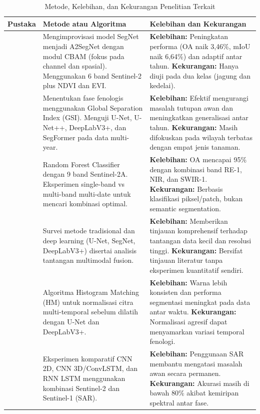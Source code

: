 \begin{table}[H]
    \centering
    \caption{Metode, Kelebihan, dan Kekurangan Penelitian Terkait}
    \label{tab:penelitian_detail}
    \footnotesize
    \begin{tabularx}{\textwidth}{|l|X|X|}
    \hline
    \textbf{Pustaka} & \textbf{Metode atau Algoritma} & \textbf{Kelebihan dan Kekurangan} \\ \hline
    \cite{gao2023} & Mengimprovisasi model SegNet menjadi A2SegNet dengan modul CBAM (fokus pada channel dan spasial). Menggunakan 6 band Sentinel-2 plus NDVI dan EVI. & \textbf{Kelebihan:} Peningkatan performa (OA naik 3,46\%, mIoU naik 6,64\%) dan adaptif antar tahun. \textbf{Kekurangan:} Hanya diuji pada dua kelas (jagung dan kedelai). \\ \hline
    \cite{li2023hetao} & Menentukan fase fenologis menggunakan Global Separation Index (GSI). Menguji U-Net, U-Net++, DeepLabV3+, dan SegFormer pada data multi-year. & \textbf{Kelebihan:} Efektif mengurangi masalah tutupan awan dan meningkatkan generalisasi antar tahun. \textbf{Kekurangan:} Masih difokuskan pada wilayah terbatas dengan empat jenis tanaman. \\ \hline
    \cite{yi2020} & Random Forest Classifier dengan 9 band Sentinel-2A. Eksperimen single-band vs multi-band multi-date untuk mencari kombinasi optimal. & \textbf{Kelebihan:} OA mencapai 95\% dengan kombinasi band RE-1, NIR, dan SWIR-1. \textbf{Kekurangan:} Berbasis klasifikasi piksel/patch, bukan semantic segmentation. \\ \hline
    \cite{luo2024} & Survei metode tradisional dan deep learning (U-Net, SegNet, DeepLabV3+) disertai analisis tantangan multimodal fusion. & \textbf{Kelebihan:} Memberikan tinjauan komprehensif terhadap tantangan data kecil dan resolusi tinggi. \textbf{Kekurangan:} Bersifat tinjauan literatur tanpa eksperimen kuantitatif sendiri. \\ \hline
    \cite{wang2023} & Algoritma Histogram Matching (HM) untuk normalisasi citra multi-temporal sebelum dilatih dengan U-Net dan DeepLabV3+. & \textbf{Kelebihan:} Warna lebih konsisten dan performa segmentasi meningkat pada data antar waktu. \textbf{Kekurangan:} Normalisasi agresif dapat menyamarkan variasi temporal fenologi. \\ \hline
    \cite{cheng2023} & Eksperimen komparatif CNN 2D, CNN 3D/ConvLSTM, dan RNN LSTM menggunakan kombinasi Sentinel-2 dan Sentinel-1 (SAR). & \textbf{Kelebihan:} Penggunaan SAR membantu mengatasi masalah awan secara permanen. \textbf{Kekurangan:} Akurasi masih di bawah 80\% akibat kemiripan spektral antar fase. \\ \hline

\end{tabularx}
\end{table}
